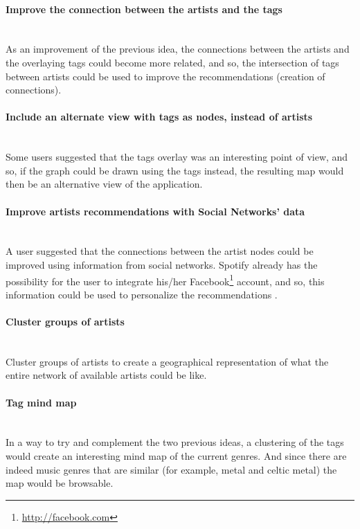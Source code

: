   \paragraph*{Improve the connection between the artists and the tags} \hfill \\
  \indent As an improvement of the previous idea, the connections between the artists and the overlaying tags could become more related, and so, the intersection of tags between artists could be used to improve the recommendations (creation of connections). 

  \paragraph*{Include an alternate view with tags as nodes, instead of artists} \hfill \\
  \indent Some users suggested that the tags overlay was an interesting point of view, and so, if the graph could be drawn using the tags instead, the resulting map would then be an alternative view of the application.

  \paragraph*{Improve artists recommendations with Social Networks' data} \hfill \\
  \indent A user suggested that the connections between the artist nodes could be improved using information from social networks.
  Spotify already has the possibility for the user to integrate his/her Facebook\footnote{\url{http://facebook.com}} account, and so, this information could be used to personalize the recommendations \cite{Fields2011}.

  \paragraph*{Cluster groups of artists} \hfill \\
  \indent Cluster groups of artists to create a geographical representation of what the entire network of available artists could be like.

  \paragraph*{Tag mind map} \hfill \\
  \indent In a way to try and complement the two previous ideas, a clustering of the tags would create an interesting mind map of the current genres.
  And since there are indeed music genres that are similar (for example, metal and celtic metal) the map would be browsable.

